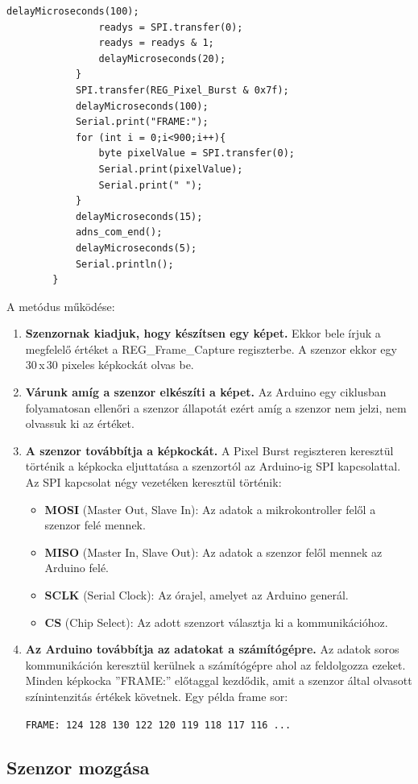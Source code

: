 \documentclass[]{thesis-ekf}
\theoremstyle{definition}
\theoremstyle{remark}
\begin{document}
\begin{enumerate}
\begin{lstlisting}[language=Arduino,label=sendFrame]
				delayMicroseconds(100); 
				readys = SPI.transfer(0); 
				readys = readys & 1;
				delayMicroseconds(20);
			}
			SPI.transfer(REG_Pixel_Burst & 0x7f); 
			delayMicroseconds(100); 
			Serial.print("FRAME:");
			for (int i = 0;i<900;i++){
				byte pixelValue = SPI.transfer(0);  
				Serial.print(pixelValue);
				Serial.print(" ");
			}
			delayMicroseconds(15); 
			adns_com_end();  
			delayMicroseconds(5); 
			Serial.println();
		}
	\end{lstlisting}
	A metódus működése:
	\begin{enumerate}[label=\arabic*.]
		\item \textbf{Szenzornak kiadjuk, hogy készítsen egy képet.} Ekkor bele írjuk a megfelelő értéket a REG\_Frame\_Capture regiszterbe. A szenzor ekkor egy 30\,x\,30 pixeles képkockát olvas be.
		\item \textbf{Várunk amíg a szenzor elkészíti a képet.} Az Arduino egy ciklusban folyamatosan ellenőri a szenzor állapotát ezért amíg a szenzor nem jelzi, nem olvassuk ki az értéket.
		\item \textbf{A szenzor továbbítja a képkockát.} A Pixel Burst regiszteren keresztül történik a képkocka eljuttatása a szenzortól az Arduino-ig SPI kapcsolattal. Az SPI kapcsolat négy vezetéken keresztül történik:
		\begin{itemize}
			\item \textbf{MOSI }(Master Out, Slave In): Az adatok a mikrokontroller felől a szenzor felé mennek.
			\item \textbf{MISO }(Master In, Slave Out): Az adatok a szenzor felől mennek az Arduino felé.
			\item \textbf{SCLK }(Serial Clock): Az órajel, amelyet az Arduino generál.
			\item \textbf{CS }(Chip Select): Az adott szenzort választja ki a kommunikációhoz.
		\end{itemize}
		\item \textbf{Az Arduino továbbítja az adatokat a számítógépre.} Az adatok soros kommunikáción keresztül kerülnek a számítógépre ahol az feldolgozza ezeket. Minden képkocka ''FRAME:'' előtaggal kezdődik, amit a szenzor által olvasott színintenzitás értékek követnek. Egy példa frame sor:
		
		\verb|FRAME: 124 128 130 122 120 119 118 117 116 ...|
	\end{enumerate}
\end{enumerate}
\subsection{Szenzor mozgása}
\end{document}
